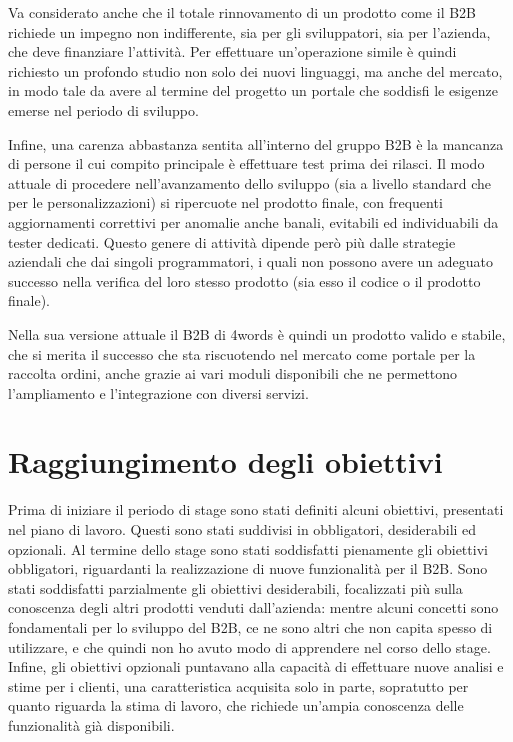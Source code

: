 Va considerato anche che il totale rinnovamento di un prodotto come il B2B richiede un impegno non indifferente, sia per gli sviluppatori, sia per l'azienda, che deve finanziare l'attività. Per effettuare un'operazione simile è quindi richiesto un profondo studio non solo dei nuovi linguaggi, ma anche del mercato, in modo tale da avere al termine del progetto un portale che soddisfi le esigenze emerse nel periodo di sviluppo.

Infine, una carenza abbastanza sentita all'interno del gruppo B2B è la mancanza di persone il cui compito principale è effettuare test prima dei rilasci. Il modo attuale di procedere nell'avanzamento dello sviluppo (sia a livello standard che per le personalizzazioni) si ripercuote nel prodotto finale, con frequenti aggiornamenti correttivi per anomalie anche banali, evitabili ed individuabili da tester dedicati. Questo genere di attività dipende però più dalle strategie aziendali che dai singoli programmatori, i quali non possono avere un adeguato successo nella verifica del loro stesso prodotto (sia esso il codice o il prodotto finale).

Nella sua versione attuale il B2B di 4words è quindi un prodotto valido e stabile, che si merita il successo che sta riscuotendo nel mercato come portale per la raccolta ordini, anche grazie ai vari moduli disponibili che ne permettono l'ampliamento e l'integrazione con diversi servizi.

\section{Raggiungimento degli obiettivi}
Prima di iniziare il periodo di stage sono stati definiti alcuni obiettivi, presentati nel piano di lavoro. Questi sono stati suddivisi in obbligatori, desiderabili ed opzionali. Al termine dello stage sono stati soddisfatti pienamente gli obiettivi obbligatori, riguardanti la realizzazione di nuove funzionalità per il B2B. Sono stati soddisfatti parzialmente gli obiettivi desiderabili, focalizzati più sulla conoscenza degli altri prodotti venduti dall'azienda: mentre alcuni concetti sono fondamentali per lo sviluppo del B2B, ce ne sono altri che non capita spesso di utilizzare, e che quindi non ho avuto modo di apprendere nel corso dello stage. Infine, gli obiettivi opzionali puntavano alla capacità di effettuare nuove analisi e stime per i clienti, una caratteristica acquisita solo in parte, sopratutto per quanto riguarda la stima di lavoro, che richiede un'ampia conoscenza delle funzionalità già disponibili.

